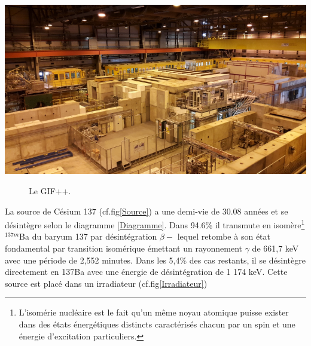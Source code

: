 \marginpar
{
	\centering
	\includegraphics[width=\marginparwidth]{GLA/GIF2.png}
	\label{GIF2}
}

\begin{figure}[ht!]
	\centering
	\hfill
	\caption{Le GIF++.}
	\label{GIF}
\end{figure}


La source de Césium 137 (cf.fig\ref{Source}) a une demi-vie de 30.08 années et se désintègre selon le diagramme \ref{Diagramme}. Dans 94.6\% il transmute en isomère\footnote{L’isomérie nucléaire est le fait qu'un même noyau atomique puisse exister dans des états énergétiques distincts caractérisés chacun par un spin et une énergie d'excitation particuliers.} $^{137m}$Ba du baryum 137 par désintégration $\beta{-}$ lequel retombe à son état fondamental par transition isomérique émettant un rayonnement $\gamma$ de 661,7 keV avec une période de 2,552 minutes. Dans les 5,4\% des cas restants, il se désintègre directement en 137Ba avec une énergie de désintégration de 1 174 keV. Cette source est placé dans un irradiateur (cf.fig\ref{Irradiateur})

